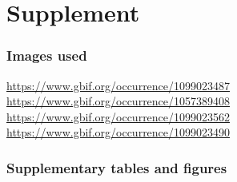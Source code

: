 \documentclass[man,floatsintext]{apa6}
\theoremstyle{definition}
\theoremstyle{definition}
\theoremstyle{definition}
\theoremstyle{remark}
\begin{document}
\newpage
\setcounter{table}{0}  \renewcommand{\thetable}{S\arabic{table}} \setcounter{figure}{0} \renewcommand{\thefigure}{S\arabic{figure}}

\hypertarget{supplement}{%
\section{Supplement}\label{supplement}}

\hypertarget{images-used}{%
\subsubsection{Images used}\label{images-used}}

\url{https://www.gbif.org/occurrence/1099023487}\\
\url{https://www.gbif.org/occurrence/1057389408}~\\
\url{https://www.gbif.org/occurrence/1099023562}~\\
\url{https://www.gbif.org/occurrence/1099023490}

\hypertarget{supplementary-tables-and-figures}{%
\subsubsection{Supplementary tables and
figures}\label{supplementary-tables-and-figures}}

\newpage
\end{document}

